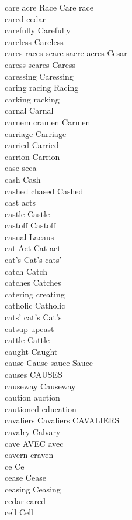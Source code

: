 care acre Race Care race\\
cared cedar\\
carefully Carefully\\
careless Careless\\
cares races scare sacre acres Cesar\\
caress scares Caress\\
caressing Caressing\\
caring racing Racing\\
carking racking\\
carnal Carnal\\
carnem cramen Carmen\\
carriage Carriage\\
carried Carried\\
carrion Carrion\\
case seca\\
cash Cash\\
cashed chased Cashed\\
cast acts\\
castle Castle\\
castoff Castoff\\
casual Lacaus\\
cat Act Cat act\\
cat's Cat's cats'\\
catch Catch\\
catches Catches\\
catering creating\\
catholic Catholic\\
cats' cat's Cat's\\
catsup upcast\\
cattle Cattle\\
caught Caught\\
cause Cause sauce Sauce\\
causes CAUSES\\
causeway Causeway\\
caution auction\\
cautioned education\\
cavaliers Cavaliers CAVALIERS\\
cavalry Calvary\\
cave AVEC avec\\
cavern craven\\
ce Ce\\
cease Cease\\
ceasing Ceasing\\
cedar cared\\
cell Cell\\
